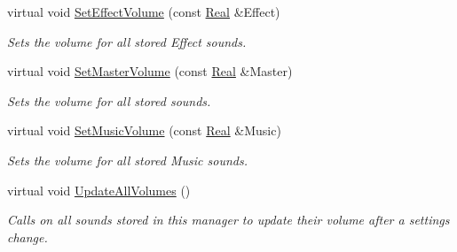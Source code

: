 \begin{DoxyCompactItemize}
virtual void \hyperlink{classMezzanine_1_1AudioManager_a390953c8eecd4446854b1e4c1c431f5a}{SetEffectVolume} (const \hyperlink{namespaceMezzanine_a726731b1a7df72bf3583e4a97282c6f6}{Real} \&Effect)
\begin{DoxyCompactList}\small\item\em Sets the volume for all stored Effect sounds. \item\end{DoxyCompactList}\item 
virtual void \hyperlink{classMezzanine_1_1AudioManager_ae3120d9f9877113fbe019f63a451f155}{SetMasterVolume} (const \hyperlink{namespaceMezzanine_a726731b1a7df72bf3583e4a97282c6f6}{Real} \&Master)
\begin{DoxyCompactList}\small\item\em Sets the volume for all stored sounds. \item\end{DoxyCompactList}\item 
virtual void \hyperlink{classMezzanine_1_1AudioManager_a8df0f5fb1e426a59cfafee4f54201db7}{SetMusicVolume} (const \hyperlink{namespaceMezzanine_a726731b1a7df72bf3583e4a97282c6f6}{Real} \&Music)
\begin{DoxyCompactList}\small\item\em Sets the volume for all stored Music sounds. \item\end{DoxyCompactList}\item 
virtual void \hyperlink{classMezzanine_1_1AudioManager_a1171a0dece85578907c6bbf82da56936}{UpdateAllVolumes} ()
\begin{DoxyCompactList}\small\item\em Calls on all sounds stored in this manager to update their volume after a settings change. \item\end{DoxyCompactList}\end{DoxyCompactItemize}
